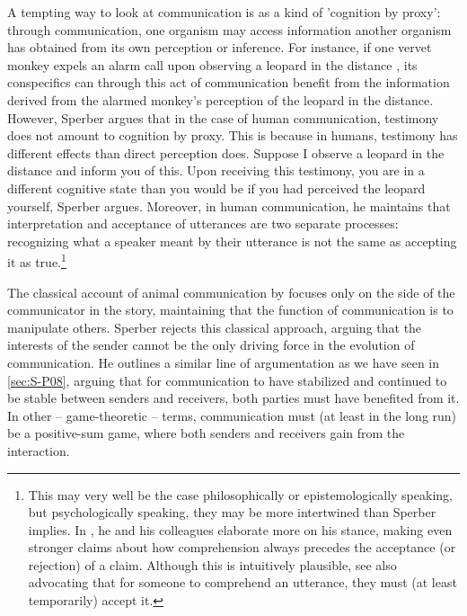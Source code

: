 A tempting way to look at communication is as a kind of 'cognition by proxy': through communication, one organism may access information another organism has obtained from its own perception or inference.
For instance, if one vervet monkey expels an alarm call upon observing a leopard in the distance \citep{Seyfarth80}, its conspecifics can through this act of communication benefit from the information derived from the alarmed monkey's perception of the leopard in the distance.
However, Sperber argues that in the case of human communication, testimony does not amount to cognition by proxy. This is because in humans, testimony has different effects than direct perception does. Suppose I observe a leopard in the distance and inform you of this. Upon receiving this testimony, you are in a different cognitive state than you would be if you had perceived the leopard yourself, Sperber argues. Moreover, in human communication, he maintains that interpretation and acceptance of utterances are two separate processes: recognizing what a speaker meant by their utterance is not the same as accepting it as true.\footnote{This may very well be the case philosophically or epistemologically speaking, but psychologically speaking, they may be more intertwined than Sperber implies. In  \citet[\S 3]{Sperber10}, he and his colleagues elaborate more on his stance, making even stronger claims about how comprehension always precedes the acceptance (or rejection) of a claim. Although this is intuitively plausible, see also \citet{Gilbert91} advocating that for someone to comprehend an utterance, they must (at least temporarily) accept it.}

The classical account of animal communication by \citet{DawkinsKrebs78} focuses only on the side of the communicator in the story, maintaining that the function of communication is to manipulate others. Sperber rejects this classical approach, arguing that the interests of the sender cannot be the only driving force in the evolution of communication.
He outlines a similar line of argumentation as we have seen in \cref{sec:S-P08},
arguing that for communication to have stabilized and continued to be stable between senders and receivers, both parties must have benefited from it. In other -- game-theoretic -- terms, communication must (at least in the long run) be a positive-sum game, where both senders and receivers gain from the interaction.

